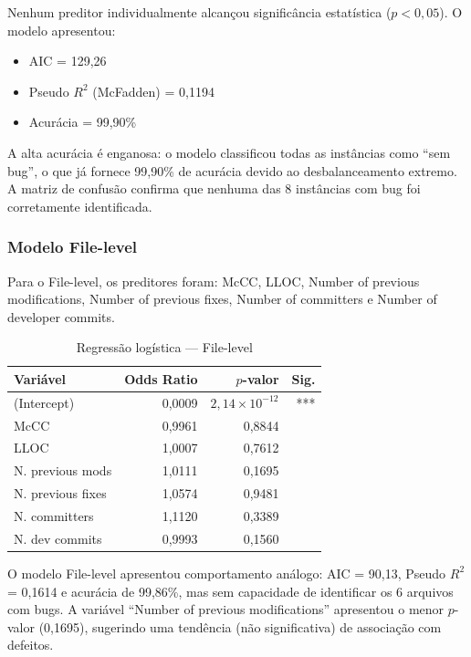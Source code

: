 \documentclass[12pt]{article}
\begin{document}
Nenhum preditor individualmente alcançou significância estatística ($p < 0{,}05$). O modelo apresentou:
\begin{itemize}
  \item AIC = 129,26
  \item Pseudo $R^2$ (McFadden) = 0,1194
  \item Acurácia = 99,90\%
\end{itemize}

A alta acurácia é enganosa: o modelo classificou todas as instâncias como ``sem bug'', o que já fornece 99,90\% de acurácia devido ao desbalanceamento extremo. A matriz de confusão confirma que nenhuma das 8 instâncias com bug foi corretamente identificada.

\subsubsection{Modelo File-level}

Para o File-level, os preditores foram: McCC, LLOC, Number of previous modifications, Number of previous fixes, Number of committers e Number of developer commits.

\begin{table}[H]
\centering
\caption{Regressão logística --- File-level}
\label{tab:logit_file}
\small
\begin{tabular}{lrrr}
\toprule
\textbf{Variável} & \textbf{Odds Ratio} & \textbf{$p$-valor} & \textbf{Sig.} \\
\midrule
(Intercept) & 0,0009 & $2{,}14 \times 10^{-12}$ & *** \\
McCC  & 0,9961 & 0,8844 & \\
LLOC  & 1,0007 & 0,7612 & \\
N. previous mods & 1,0111 & 0,1695 & \\
N. previous fixes & 1,0574 & 0,9481 & \\
N. committers & 1,1120 & 0,3389 & \\
N. dev commits & 0,9993 & 0,1560 & \\
\bottomrule
\end{tabular}
\end{table}

O modelo File-level apresentou comportamento análogo: AIC = 90,13, Pseudo $R^2$ = 0,1614 e acurácia de 99,86\%, mas sem capacidade de identificar os 6 arquivos com bugs. A variável ``Number of previous modifications'' apresentou o menor $p$-valor (0,1695), sugerindo uma tendência (não significativa) de associação com defeitos.
\end{document}
